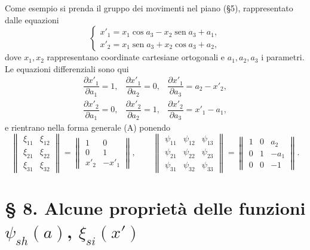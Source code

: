 \documentclass[11pt]{book}
\newcommand{\sen}{\operatorname{sen}}
\begin{document}
Come esempio si prenda il gruppo dei movimenti nel piano (\S{}5), rappresentato dalle equazioni
\[
\begin{cases}
 x'_1=x_1\cos a_3-x_2\sen a_3+a_1,\\
 x'_2=x_1\sen a_3+x_2\cos a_3+a_2,
\end{cases}
\]
dove $x_1,x_2$ rappresentano coordinate cartesiane ortogonali e $a_1,a_2,a_3$ i parametri. Le equazioni differenziali sono qui
\[
\begin{array}{lll}
 \dfrac{\partial x'_1}{\partial a_1}=1, &
 \dfrac{\partial x'_1}{\partial a_2}=0, &
 \dfrac{\partial x'_1}{\partial a_3}=a_2-x'_2,\\[0.9em]
 \dfrac{\partial x'_2}{\partial a_1}=0, &
 \dfrac{\partial x'_2}{\partial a_2}=1, &
 \dfrac{\partial x'_2}{\partial a_3}=x'_1-a_1,
\end{array}
\]
e rientrano nella forma generale (A) ponendo
\[
 \left\|\begin{array}{cc}
 \xi_{11}&\xi_{12}\\
 \xi_{21}&\xi_{22}\\
 \xi_{31}&\xi_{32}
 \end{array}\right\|
 =
 \left\|\begin{array}{cc}
 1&0\\
 0&1\\
 x'_2&-x'_1
 \end{array}\right\|,
 \qquad
 \left\|\begin{array}{ccc}
 \psi_{11}&\psi_{12}&\psi_{13}\\
 \psi_{21}&\psi_{22}&\psi_{23}\\
 \psi_{31}&\psi_{32}&\psi_{33}
 \end{array}\right\|
 =
 \left\|\begin{array}{ccc}
 1&0&a_2\\
 0&1&-a_1\\
 0&0&-1
 \end{array}\right\|.
\]


\section*{\S{} 8. Alcune proprietà delle funzioni $\psi_{sh}(a)$, $\xi_{si}(x')$}
\end{document}
